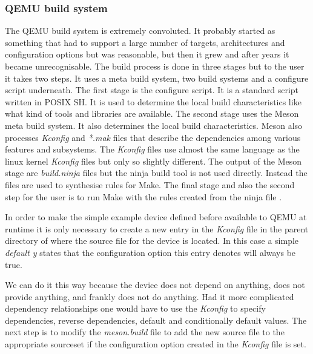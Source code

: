 \begin{codeblock}
    
\end{codeblock}

\subsubsection{QEMU build system}

The QEMU build system is extremely convoluted. It probably started as something
that had to support a large number of targets, architectures and configuration
options but was reasonable, but then it grew and after years it became
unrecognisable. The build process is done in three stages but to the user it
takes two steps. It uses a meta build system, two build systems and a configure
script underneath. The first stage is the configure script. It is a standard
script written in POSIX SH. It is used to determine the local build
characteristics like what kind of tools and libraries are available. The second
stage uses the Meson meta build system. It also determines the local build
characteristics. Meson also processes \emph{Kconfig} and \emph{*.mak} files
that describe the dependencies among various features and subsystems. The
\emph{Kconfig} files use almost the same language as the linux kernel
\emph{Kconfig} files but only so slightly different. The output of the Meson
stage are \emph{build.ninja} files but the ninja build tool is not used
directly.  Instead the files are used to synthesise rules for Make. The final
stage and also the second step for the user is to run Make with the rules
created from the ninja file \cite{qemu2022}.

In order to make the simple example device defined before available to QEMU at
runtime it is only necessary to create a new entry in the \emph{Kconfig} file
in the parent directory of where the source file for the device is located. In
this case a simple \emph{default y} states that the configuration option this
entry denotes will always be true.

\begin{codeblock}
    
\end{codeblock}

\noindent
We can do it this way because the device does not depend on anything, does not
provide anything, and frankly does not do anything. Had it more complicated
dependency relationships one would have to use the \emph{Kconfig} to specify
dependencies, reverse dependencies, default and conditionally default values.
The next step is to modify the \emph{meson.build} file to add the new source
file to the appropriate sourceset if the configuration option created in the
\emph{Kconfig} file is set.

